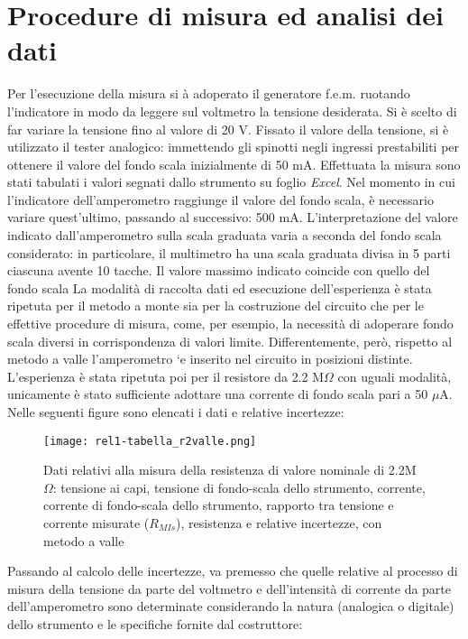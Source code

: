 \documentclass{article}
\begin{document}
\section{Procedure di misura ed analisi dei dati}
Per l’esecuzione della misura si à adoperato il generatore f.e.m. ruotando l’indicatore
in modo da leggere sul voltmetro la tensione desiderata. Si è scelto
di far variare la tensione fino al valore di 20 V. Fissato il valore della tensione,
si è utilizzato il tester analogico: immettendo gli spinotti negli ingressi prestabiliti
per ottenere il valore del fondo scala inizialmente di 50 mA. Effettuata
la misura sono stati tabulati i valori segnati dallo strumento su foglio \emph{Excel}.
Nel momento in cui l’indicatore dell’amperometro raggiunge il valore del fondo
scala, è necessario variare quest’ultimo, passando al successivo: 500 mA. L’interpretazione
del valore indicato dall’amperometro sulla scala graduata varia a
seconda del fondo scala considerato: in particolare, il multimetro ha una scala
graduata divisa in 5 parti ciascuna avente 10 tacche. Il valore massimo indicato
coincide con quello del fondo scala
La modalità di raccolta dati ed esecuzione dell’esperienza è stata ripetuta per
il metodo a monte sia per la costruzione del circuito che per le effettive procedure
di misura, come, per esempio, la necessità di adoperare fondo scala diversi in
corrispondenza di valori limite. Differentemente, però, rispetto al metodo a
valle l’amperometro `e inserito nel circuito in posizioni distinte. L’esperienza è stata ripetuta poi per il resistore da 2.2 M$\Omega$ con uguali modalità, unicamente è stato sufficiente adottare una corrente di fondo scala pari a 50 $\mu$A.
Nelle seguenti figure sono elencati i dati e relative incertezze:
\begin{figure}
    \begin{center}
        \texttt{[image: rel1-tabella\_r2valle.png]}
    \end{center}
    \caption{Dati relativi alla misura della resistenza di valore nominale di 2.2M$\Omega$:
tensione ai capi, tensione di fondo-scala dello strumento, corrente, corrente di
fondo-scala dello strumento, rapporto tra tensione e corrente misurate ($R_{MIs}$),
resistenza e relative incertezze, con metodo a valle}
    \label{figura1}
\end{figure}
Passando al calcolo delle incertezze, va premesso che quelle relative al processo
di misura della tensione da parte del voltmetro e dell’intensità di corrente da parte dell’amperometro sono determinate considerando la natura (analogica o digitale) dello strumento e le specifiche fornite dal costruttore:
\end{document}
